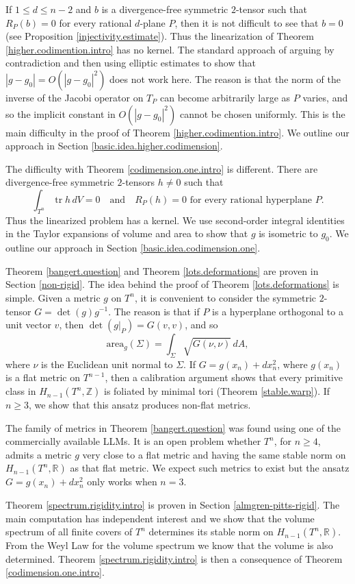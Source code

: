 \documentclass[11pt]{amsart}
\def\R{\mathbb R}
\def\Z{\mathbb Z}
\def\tr{\operatorname{tr}}
\theoremstyle{remark}
\theoremstyle{definition}
\begin{document}
	If $1\leq d\leq n-2$ and $b$ is a divergence-free symmetric $2$-tensor such that $R_P(b)=0$ for every rational $d$-plane $P$, then it is not difficult to see that $b=0$ (see Proposition \ref{injectivity.estimate}). Thus the linearization of Theorem \ref{higher.codimention.intro} has no kernel. The standard approach of arguing by contradiction and then using elliptic estimates to show that $|g-g_0|=O(|g-g_0|^2)$ does not work here. The reason is that the norm of the inverse of the Jacobi operator on $T_P$ can become arbitrarily large as $P$ varies, and so the implicit constant in $O(|g-g_0|^2)$ cannot be chosen uniformly. This is the main difficulty in the proof of Theorem \ref{higher.codimention.intro}. We outline our approach in Section \ref{basic.idea.higher.codimension}.
	
	The difficulty with Theorem \ref{codimension.one.intro} is different. There are divergence-free symmetric $2$-tensors $h\neq 0$ such that
	$$\int_{T^n} \tr h\,dV=0\quad\text{and}\quad R_P(h)=0\text{ for every rational hyperplane }P.$$
	Thus the linearized problem has a kernel. We use second-order integral identities in the Taylor expansions of volume and area to show that $g$ is isometric to $g_0$. We outline our approach in Section \ref{basic.idea.codimension.one}.
	
	Theorem \ref{bangert.question} and Theorem \ref{lots.deformations} are proven in Section \ref{non-rigid}. The idea behind the proof of Theorem \ref{lots.deformations} is simple. Given a metric $g$ on $T^n$, it is convenient to consider the symmetric $2$-tensor $G=\det(g)g^{-1}$. The reason is that if $P$ is a hyperplane orthogonal to a unit vector $v$, then $\det(g|_{P})=G(v,v)$, and so
	$$\text{area}_g(\Sigma)=\int_\Sigma\sqrt{G(\nu,\nu)}\,dA,$$
	where $\nu$ is the Euclidean unit normal to $\Sigma$.
	If $G=g(x_n)+dx_n^2$, where $g(x_n)$ is a flat metric on $T^{n-1}$, then a calibration argument shows that every primitive class in $H_{n-1}(T^n,\Z)$ is foliated by minimal tori (Theorem \ref{stable.warp}). If $n\geq 3$, we show that this ansatz produces non-flat metrics.
	
	The family of metrics in Theorem \ref{bangert.question} was found using one of the commercially available LLMs. It is an open problem whether $T^n$, for $n\geq 4$, admits a metric $g$ very close to a flat metric and having the same stable norm on $H_{n-1}(T^n,\R)$ as that flat metric. We expect such metrics to exist but the ansatz $G=g(x_n)+dx_n^2$ only works when $n=3$.
	
	Theorem \ref{spectrum.rigidity.intro} is proven in Section \ref{almgren-pitts-rigid}. The main computation has independent interest and we show that the volume spectrum of all finite covers of $T^n$ determines its stable norm on $H_{n-1}(T^n,\R)$. From the Weyl Law for the volume spectrum \cite{lmn} we know that the volume is also determined. Theorem \ref{spectrum.rigidity.intro}  is then a consequence of Theorem \ref{codimension.one.intro}.
	
\end{document}
